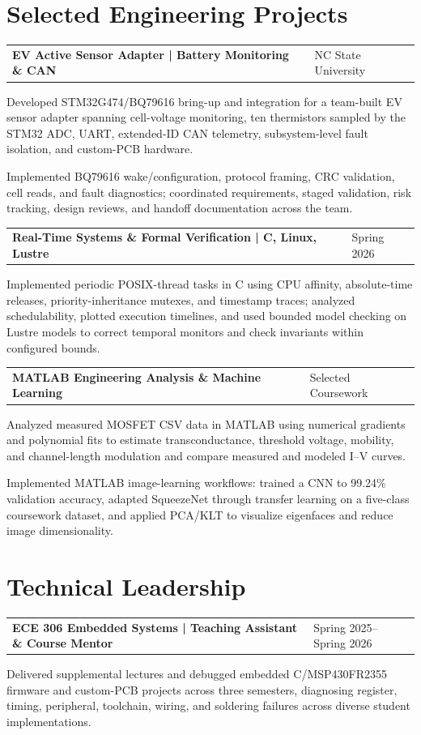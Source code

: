 \documentclass[10pt,letterpaper]{article}
\makeatletter
\newcommand{\resumeentry}[2]{%
  \begin{tabularx}{\textwidth}{@{}X>{\raggedleft\arraybackslash}p{2.40in}@{}}
    \textbf{#1} & #2
  \end{tabularx}\vspace{-0.075cm}
}
\makeatother
\begin{document}
\section{Selected Engineering Projects}
\resumeentry{EV Active Sensor Adapter | Battery Monitoring \& CAN}{NC State University}
\begin{resumebullets}
  \item Developed STM32G474/BQ79616 bring-up and integration for a team-built EV sensor adapter spanning cell-voltage monitoring, ten thermistors sampled by the STM32 ADC, UART, extended-ID CAN telemetry, subsystem-level fault isolation, and custom-PCB hardware.
  \item Implemented BQ79616 wake/configuration, protocol framing, CRC validation, cell reads, and fault diagnostics; coordinated requirements, staged validation, risk tracking, design reviews, and handoff documentation across the team.
\end{resumebullets}

\resumeentry{Real-Time Systems \& Formal Verification | C, Linux, Lustre}{Spring 2026}
\begin{resumebullets}
  \item Implemented periodic POSIX-thread tasks in C using CPU affinity, absolute-time releases, priority-inheritance mutexes, and timestamp traces; analyzed schedulability, plotted execution timelines, and used bounded model checking on Lustre models to correct temporal monitors and check invariants within configured bounds.
\end{resumebullets}

\resumeentry{MATLAB Engineering Analysis \& Machine Learning}{Selected Coursework}
\begin{resumebullets}
  \item Analyzed measured MOSFET CSV data in MATLAB using numerical gradients and polynomial fits to estimate transconductance, threshold voltage, mobility, and channel-length modulation and compare measured and modeled I--V curves.
  \item Implemented MATLAB image-learning workflows: trained a CNN to 99.24\% validation accuracy, adapted SqueezeNet through transfer learning on a five-class coursework dataset, and applied PCA/KLT to visualize eigenfaces and reduce image dimensionality.
\end{resumebullets}

\section{Technical Leadership}
\resumeentry{ECE 306 Embedded Systems | Teaching Assistant \& Course Mentor}{Spring 2025--Spring 2026}
\begin{resumebullets}
  \item Delivered supplemental lectures and debugged embedded C/MSP430FR2355 firmware and custom-PCB projects across three semesters, diagnosing register, timing, peripheral, toolchain, wiring, and soldering failures across diverse student implementations.
\end{resumebullets}
\end{document}
